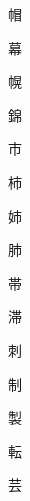 \begin{spacing}{2.5}
{\Huge \begin{CJK}{UTF8}{min} 帽\end{CJK}}\hspace{0.1cm}
{\Huge \begin{CJK}{UTF8}{min} 幕\end{CJK}}\hspace{0.1cm}
{\Huge \begin{CJK}{UTF8}{min} 幌\end{CJK}}\hspace{0.1cm}
{\Huge \begin{CJK}{UTF8}{min} 錦\end{CJK}}\hspace{0.1cm}
{\Huge \begin{CJK}{UTF8}{min} 市\end{CJK}}\hspace{0.1cm}
{\Huge \begin{CJK}{UTF8}{min} 柿\end{CJK}}\hspace{0.1cm}
{\Huge \begin{CJK}{UTF8}{min} 姉\end{CJK}}\hspace{0.1cm}
{\Huge \begin{CJK}{UTF8}{min} 肺\end{CJK}}\hspace{0.1cm}
{\Huge \begin{CJK}{UTF8}{min} 帯\end{CJK}}\hspace{0.1cm}
{\Huge \begin{CJK}{UTF8}{min} 滞\end{CJK}}\hspace{0.1cm}
{\Huge \begin{CJK}{UTF8}{min} 刺\end{CJK}}\hspace{0.1cm}
{\Huge \begin{CJK}{UTF8}{min} 制\end{CJK}}\hspace{0.1cm}
{\Huge \begin{CJK}{UTF8}{min} 製\end{CJK}}\hspace{0.1cm}
{\Huge \begin{CJK}{UTF8}{min} 転\end{CJK}}\hspace{0.1cm}
{\Huge \begin{CJK}{UTF8}{min} 芸\end{CJK}}\hspace{0.1cm}

\end{spacing}
